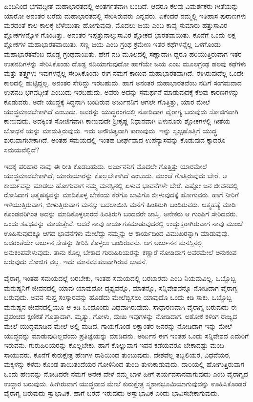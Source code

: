 ಹಿಂದಿನಿಂದ ಭಗವದ್ಗೀತೆ ಮಹಾಭಾರತದಲ್ಲಿ ಅಂತರ್ಗತವಾಗಿ ಬಂದಿದೆ. ಆದರೂ ಕೆಲವು ವಿಮರ್ಶಕರು ಗೀತೆಯನ್ನು ಯಾರೋ ಅನಂತರ ಬರೆದು ಮಹಾಭಾರತದಲ್ಲಿ ಸೇರಿಸಿರುವರು ಎನ್ನವರು. ಏಕೆಂದರೆ ನಮ್ಮಲ್ಲಿ ಇತಿಹಾಸ ಪುರಾಣಗಳು ಮರದಂತೆ ಕಾಲ ಕಾಲಕ್ಕೆ ಬೆಳೆಯುತ್ತಾ ಹೋಗುವುವು. ಮೊದಲು ಜಯ ಎಂಬ ಕಾವ್ಯ ಸುಮಾರು ಹತ್ತುಸಾವಿರ ಶ್ಲೋಕಗಳನ್ನೊಳ ಗೊಂಡಿತ್ತು. ಅನಂತರ ಇಪ್ಪತ್ತುನಾಲ್ಕುಸಾವಿರ ಶ್ಲೋಕದ ಭಾರತವಾಯಿತು. ಕೊನೆಗೆ ಒಂದು ಲಕ್ಷ ಶ್ಲೋಕಗಳ ಮಹಾಭಾರತವಾಯಿತು. ಸಣ್ಣ ಜಯ ಎಂಬ ಗ್ರಂಥ ಕ್ರಮೇಣ ಇತರ ಕಥೆಗಳನ್ನೆಲ್ಲ ಒಳಗೊಂಡು ಮಹಾಭಾರತವೆಂಬ ದೊಡ್ಡ ಗ್ರಂಥವಾಯಿತು. ಹೇಗೆ ನದಿ ಮೂಲದಲ್ಲಿ ಸಣ್ಣಾದಾಗಿ ದ್ದರೂ ಹರಿಯುತ್ತಿರುವಾಗ ಇತರ ಉಪನದಿಗಳನ್ನು ಸೇರಿಸಿಕೊಂಡು ದೊಡ್ಡ ನದಿಯಾಗುವುದೋ ಹಾಗೆಯೇ ಜಯ ಎಂಬ ಮೂಲಗ್ರಂಥ ಹಲವು ಕಥೆಗಳು ಮತ್ತು ತತ್ತ್ವಗಳು ಇವುಗಳನ್ನೆಲ್ಲ ಸೇರಿಸಿಕೊಂಡು ಈಗ ನಮಗೆ ಕಾಣುವ ಮಹಾಭಾರತವಾಗಿದೆ. ಈಗಿರುವುದೆಲ್ಲ ಒಂದೇ ಕಾಲದಲ್ಲಿ ಹುಟ್ಟಿದ್ದಲ್ಲ. ಅನಂತರ ಸೇರಿದ್ದು ಇರಬಹುದು. ಹಾಗೆ ಅನಂತರ ಮಹಾಭಾರತವೆಂಬ ನದಿಗೆ ಸಂಗಮವಾದ ಉಪನದಿ ಭಗವದ್ಗೀತೆ ಎಂಬುದು ಇರಬಹುದು. ಅವರು ಅದನ್ನು ಸಮರ್ಥನೆ ಮಾಡುವುದಕ್ಕೆ ಕೆಲವು ಕಾರಣಗಳನ್ನು ಕೊಡುವರು. ಅದೇ ಯುದ್ಧಕ್ಕೆ ಸಿದ್ಧನಾಗಿ ಬಂದಿರುವ ಅರ್ಜುನನಿಗೆ ಆಗಲೇ ಗೊತ್ತಿತ್ತು, ಯಾರ ಮೇಲೆ ಯುದ್ಧಮಾಡಬೇಕಾಗಿದೆ ಎಂಬುದು. ಅವರನ್ನು ಯುದ್ಧರಂಗದಲ್ಲಿ ನೋಡಿದಾಗ ವೈರಾಗ್ಯ ಬರುವುದು ಸೋಜಿಗವಾಗಿ ಕಾಣುವುದು. ಅದಕ್ಕಿಂತ ಸೋಜಿಗವಾಗಿ ಕಾಣುವುದೇ ಶ್ರೀಕೃಷ್ಣ ನಿಧಾನವಾಗಿ ಏಳುನೂರು ಶ್ಲೋಕಗಳಲ್ಲಿ ಗೀತೆಯ ಬೋಧನೆ ಯನ್ನು ಮಾಡುತ್ತಿರುವುದು. ಇದು ಅನೌಚಿತ್ಯವಾಗಿ ಕಾಣುವುದು. ಇನ್ನು ಸ್ವಲ್ಪಹೊತ್ತಿಗೆ ಯುದ್ಧ ಶುರುವಾಗಬೇಕಾಗಿದೆ. ಅಂತಹ ಸಮಯದಲ್ಲಿ ಇಂತಹ ದೀರ್ಘವಾದ ಉಪನ್ಯಾಸವನ್ನು ಕೊಡುವುದ ಕ್ಕಾದರೂ ಸಮಯವೆಲ್ಲಿದೆ?

ಇದಕ್ಕೆ ಪರಿಹಾರ ನಾವು ಈ ರೀತಿ ಕೊಡಬಹುದು. ಅರ್ಜುನನಿಗೆ ಮೊದಲೇ ಗೊತ್ತಿತ್ತು ಯಾರಮೇಲೆ ಯುದ್ಧಮಾಡಬೇಕಾಗಿದೆ, ಯಾರುಯಾರನ್ನು ಕೊಲ್ಲಬೇಕಾಗಿದೆ ಎಂಬುದು. ಮುಂಚೆ ಗೊತ್ತಿರುವುದು ಬೇರೆ. ಆ ಕಾರ್ಯವನ್ನು ಮಾಡಲು ಹೋಗುವಾಗ ನಮ್ಮ ಮನಸ್ಸಿನಲ್ಲಿ ಏಳುವ ಭಾವನೆಗಳೇ ಬೇರೆ. ಎಷ್ಟೋ ಜನ ಜೀವನದಲ್ಲಿ ರೋಸಿದಾಗ ಆತ್ಮಹತ್ಯವನ್ನು ಮಾಡಿಕೊಳ್ಳ ಬೇಕೆಂದು ಕೆರೆಗೊ ಬಾವಿಗೊ ಬೀಳುವುದಕ್ಕೆ ಹೋಗುವರು. ಹಾಗೆ ನೀರಿಗೆ ಇಳಿಯುತ್ತಿರುವಾಗ, ಬೀಳುತ್ತಿರುವಾಗ ಮನಸ್ಸು ಬದಲಾಯಿಸಿ ಮನೆಗೆ ಹಿಂತಿರುಗಿ ಬಂದಿರುವರು. ಆತ್ಮಹತ್ಯೆ ಮಾಡಿ ಕೊಂಡವರಿಗಿಂತ ಅದನ್ನು ಮಾಡಿಕೊಳ್ಳಲಾರದೆ ಹಿಂತಿರುಗಿ ಬಂದವರೇ ಜಾಸ್ತಿ. ಅನೇಕರು ಆ ಗುಂಪಿಗೆ ಸೇರಿದವರು. ಒಂದು ಶಪಥವನ್ನು ಮಾಡುತ್ತೇವೆ. ಆದರೆ ನಾವು ಕಾರ್ಯಗತಮಾಡುವುದರಲ್ಲಿ ಉದ್ಯುಕ್ತರಾಗಿರುವಾಗ ನಾವು ಮುಂಚೆ ಊಹಿಸುವುದಕ್ಕೂ ಆಗದ ಭಾವನೆಗಳು ಮೇಲೆದ್ದು ನಮ್ಮನ್ನು ಆ ಕಾರ್ಯದಿಂದ ವಿಮುಖರನ್ನಾಗಿ ಮಾಡುವುವು. ಅದರಂತೆಯೇ ಅರ್ಜುನ ಸೇಡನ್ನು ತೀರಿಸಿ ಕೊಳ್ಳಲು ಬಂದಿರುವನು. ಆಗ ಅರ್ಜುನನ ಮನಸ್ಸಿನಲ್ಲಿ ಅನುಕಂಪವೇಳುವುದು. ತಾನು ಕೊಲ್ಲ ಬೇಕಾದ ಗುರುಹಿರಿಯರನ್ನು ಕಣ್ಣಾರೆ ನೋಡಿದಾಗ ಅವರಮೇಲೆ ಅನುಕಂಪ ಬರುವುದು ಸೋಜಿಗ ವಲ್ಲ. ಇದು ಮಾನವಸಹಜವಾಗಿರುವ ಭಾವನೆ.

ವೈರಾಗ್ಯ ಇಂತಹ ಸಮಯದಲ್ಲೆ ಬರಬೇಕು, ಇಂತಹ ಸಮಯದಲ್ಲಿ ಬರಬಾರದು ಎಂಬ ನಿಯಮವಿಲ್ಲ. ಒಬ್ಬೊಬ್ಬ ಮನುಷ್ಯನಿಗೆ ಜೀವನದಲ್ಲಿ ಯಾವು ಯಾವುದೋ ದೃಶ್ಯವನ್ನೊ, ಮಾತನ್ನೊ, ಸನ್ನಿವೇಶವನ್ನೊ ನೋಡಿದಾಗ ವೈರಾಗ್ಯ ಬರುವುದು. ಅವನ ಸುಪ್ತ ಸಂಸ್ಕಾರವನ್ನು ಹೊಡೆದು ಮೇಲೆಬ್ಬಿಸಲು ಯಾವುದೊ ಒಂದು ಕಿಡಿ ಸಾಕು. ಒಬ್ಬೊಬ್ಬ ಮನುಷ್ಯನ ಜೀವನದಲ್ಲಿಯೂ ಆ ಕಿಡಿ ಒಂದೊಂದು ವಿಧವಾಗಿರುವುದು. ಸಾಧಾರಣವಾಗಿ ವೈರಾಗ್ಯ ಬರುವುದು ಈ ಪ್ರಪಂಚದ ಕ್ಷಣಿಕತೆ ಗೊತ್ತಾದಾಗ. ಮೃತ್ಯು, ಗೋಳು, ದುಃಖ ಇವುಗಳನ್ನು ನೋಡಿದಾಗ. ಅಶೋಕ ಕಳಿಂಗ ರಾಜ್ಯದ ಮೇಲೆ ಯುದ್ಧಮಾಡಿದ ಮೇಲೆ ಅಲ್ಲಿ ಮಡಿದ, ಗಾಯಗೊಂಡ ಲಕ್ಷಾಂತರ ಜನರನ್ನು ನೋಡಿದಾಗ ಇನ್ನು ಮೇಲೆ ಯುದ್ಧವನ್ನು ಮಾಡುವುದಿಲ್ಲವೆಂದು ಪ್ರತಿಜ್ಞೆಯನ್ನು ಮಾಡಿದನು. ಅರ್ಜುನ ಈಗ ಇಂತಹ ಒಂದು ಸನ್ನಿವೇಶದ ಎದುರಿಗೆ ಇರುವನು. ಗುರುಹಿರಿಯರನ್ನು ಕೊಲ್ಲಬೇಕು. ಹಾಗೆ ಕೊಲ್ಲುವಾಗ ಇವನ ಕಡೆಯವರೂ ಬೇಕಾದಷ್ಟು ಮಂದಿ ಸಾಯುವರು. ಕೊನೆಗೆ ಕುರುಕ್ಷೇತ್ರ ಹೆಣಗಳ ರಾಶಿಯಿಂದ ತುಂಬುವುದು. ದೇಶವೆಲ್ಲ ತಬ್ಬಲಿಯರ, ವಿಧವೆಯರ, ಮಕ್ಕಳನ್ನು ಕಳೆದು ಕೊಂಡ ತಾಯಿತಂದೆಯರ ಗೋಳಿನಿಂದ ತುಂಬಿ ತುಳುಕಾಡುವುದು. ದಾರಿಯಲ್ಲಿ ಹೋಗುತ್ತಿರುವಾಗ ಒಂದು ಹೆಣವನ್ನು ನೋಡಿದರೇ ನಮಗೆ ಅನೇಕ ವೇಳೆ ನಮ್ಮ ಬಾಳೆ ಹೀಗೆ ಪರ್ಯವಸಾನವಾಗುವುದು ಎಂಬ ವೈರಾಗ್ಯದ ಉದ್ಗಾರ ಬರುವುದು. ಹೀಗಿರುವಾಗ ಯುದ್ಧವಾದ ಮೇಲೆ ಕುರುಕ್ಷೇತ್ರ ಸ್ಮಶಾನಭೂಮಿಯಾಗುವುದನ್ನು ಊಹಿಸಿಕೊಂಡರೆ ವೈರಾಗ್ಯ ಬರುವುದು ಸ್ವಾಭಾವಿಕ. ಹಾಗೆ ಬರದೆ ಇರುವುದು ಅಸ್ವಾಭಾವಿಕ ಎಂದು ಭಾವಿಸಬೇಕಾಗುವುದು.

